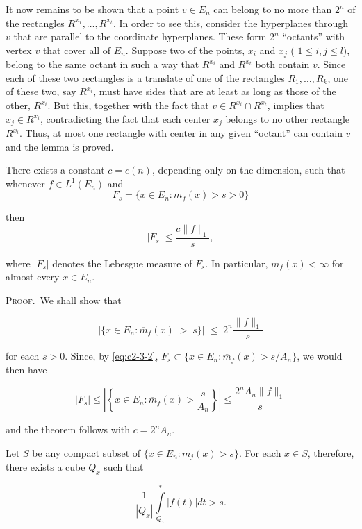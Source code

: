 It now remains to be shown that a point $v \in E_n$ can belong to no more than $2^n$ of the rectangles $R^{x_1}, \ldots, R^{x_t}$. In order to see this, consider the hyperplanes through $v$ that are parallel to the coordinate hyperplanes. These form $2^n$ ``octants'' with vertex $v$ that cover all of $E_n$. Suppose two of the points, $x_i$ and $x_j$ ( $1 \leq i, j \leq l$), belong to the same octant in such a way that $R^{x_i}$ and $R^{x_t}$ both contain $v$. Since each of these two rectangles is a translate of one of the rectangles $R_1, \ldots, R_k$, one of these two, say $R^{x_i}$, must have sides that are at least as long as those of the other, $R^{x_i}$. But this, together with the fact that $v \in R^{x_i} \cap R^{x_t}$, implies that $x_j \in R^{x_i}$, contradicting the fact that each center $x_j$ belongs to no other rectangle $R^{x_i}$. Thus, at most one rectangle with center in any given ``octant'' can contain $v$ and the lemma is proved.

\begin{theorem}
\label{thm:c2-3-4}
There exists a constant $c = c(n)$, depending only on the dimension, such that whenever $f \in L^{1}(E_{n})$ and
\[
F_{s}=\{x\in E_{n}\colon m_{f}(x)>s>0\}
\]

then
\[
|F_{s}|\leq\frac{c\|f\|_{1}}{s},
\]

where $|F_s|$ denotes the Lebesgue measure of $F_s$. In particular, $m_f(x) < \infty$ for almost every $x \in E_n$.
\end{theorem}

\textsc{Proof.}\ We shall show that

\begin{equation}\label{eq:c2-3-5}
\left|\{x\in E_{n}\colon\overline{{m}}_{f}(x)\;>\;s\}\right|\;\leq\;2^{n}\frac{\|f\|_{1}}{s}
\end{equation}

for each $s > 0$. Since, by \eqref{eq:c2-3-2}, $F_s \subset \{x \in E_n: \overline{m}_f(x) > s/A_n\}$, we would then have

\[
\left|F_{s}\right|\leq\left|\left\{x\in E_{n}\colon\overline{m}_{f}(x)>\frac{s}{A_{n}}\right\}\right|\leq\frac{2^{n}A_{n}\|f\|_{1}}{s}
\]

and the theorem follows with $c = 2^{n}A_{n}$.

Let $S$ be any compact subset of $\{x \in E_n: \overline{m}_j(x) > s\}$. For each $x \in S$, therefore, there exists a cube $Q_x$ such that

\[
\frac{1}{\left|Q_{x}\right|}\int\limits_{Q_{x}}^{*}\left|f(t)\right|dt>s.
\]

